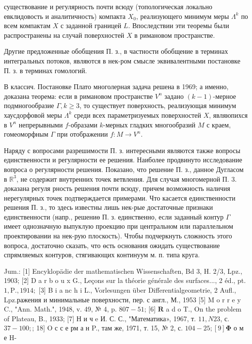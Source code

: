 \documentclass[10pt]{article}
\begin{document}
существование и регулярность почти всюду (топологическая локально евклидовость и аналитичность) компакта $X_{0}$, реализующего минимум меры $\Lambda^{k}$ по всем компактам $X$ с заданной границей $L$. Впоследствии эти теоремы были распространены на случай поверхностей $X$ в римановом пространстве.



Другие предложенные обобщения П. з., в частности обобщение в терминах интегральных потоков, являются в нек-ром смысле эквивалентными постановке П. з. в терминах гомологий.



В классич. Постановке Плато многолерная задача решена в 1969; а именно, доказана теорема: если в римановом пространстве $V^{n}$ задано $(k-1)$-мерное подмногообразие $\Gamma, k \geqslant 3$, то существует поверхность, реализующая минимум хаусдорфовой меры $\Lambda^{k}$ среди всех параметризуемых поверхностей $X$, являюпихся в $V^{n}$ непрерывными $f$-образами $k$-мерных гладких многообразий $M$ с краем, гомеоморфным $\Gamma$ при отображении $f: M \rightarrow V^{n}$.



Наряду с вопросами разрешимости П. з. интересными являются также вопросы единственности и регулярности ее решения. Наиболее продвинуто исследование вопроса о регулярности решения. Показано, что решение П. з., данное Дугласом в $\mathbb{R}^{3}$, не содержит внутренних точек ветвления. Для случая многомерной П. 3. доказана регуля рность решения почти всюду, причем возможность наличия нерегулярных точек подтверждается примерами. Что касается единственности решения П. з., то здесь известны лишь нек-рые достаточные признаки единственности (напр., решениө П. з. единственно, если заданный контур $\Gamma$ имеет однозначную выпуклую проекцию при центральном или параллельном проектировании на нек-рую плоскость). Чтобы подчеркнуть сложность этого вопроса, достаточно сказать, что өсть основания ожидать существование спрямляемых контуров, стягивающих континуум м. п. типа круга.



Jum.: [1] Encyklopädie der mathematischen Wissenschaften, Bd 3, H. 2/3, Lpz., 1903; [2] D a r b o u x G., Leçons sur la théorie générale des surfaces..., 2 éd., pt. $1, \mathrm{P} ., 1914 ;$ [3] B i a nc h i L., Vorlesungen über Differentialgeometrie, 2 Aufl., Lpz.ражения и минимальные поверхности, пер. с англ., М., 1953 [5] M o r r e y C., "Ann. Math.", 1948, v. 49, № 4, p. $807-51$; [6] $\mathbf{R}$ a d o T., On the problem of Plateau, B., 1933; [7] Н и ч e И. С. С., "Математика», 1967, т. $11, N 23$, с. $37-100 ;$; 18$]$ O с с е рм а н P., там же, 1971, т. 15, № 2, с. $104-25 ;[9] \boldsymbol{\Phi}$ о м е H-
\end{document}
